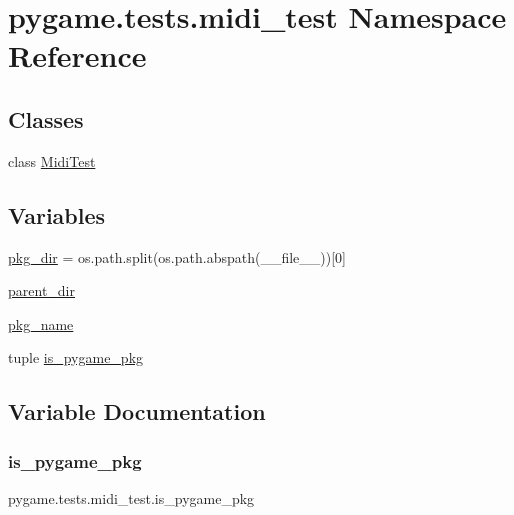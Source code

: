 \hypertarget{namespacepygame_1_1tests_1_1midi__test}{}\section{pygame.\+tests.\+midi\+\_\+test Namespace Reference}
\label{namespacepygame_1_1tests_1_1midi__test}
\subsection*{Classes}
\begin{DoxyCompactItemize}
\item 
class \hyperlink{classpygame_1_1tests_1_1midi__test_1_1_midi_test}{Midi\+Test}
\end{DoxyCompactItemize}
\subsection*{Variables}
\begin{DoxyCompactItemize}
\item 
\hyperlink{namespacepygame_1_1tests_1_1midi__test_a1a22cf194c8763d0c4488fdc0c03ce4f}{pkg\+\_\+dir} = os.\+path.\+split(os.\+path.\+abspath(\+\_\+\+\_\+file\+\_\+\+\_\+))\mbox{[}0\mbox{]}
\item 
\hyperlink{namespacepygame_1_1tests_1_1midi__test_ad3312256b255a29d5e0545098274ea9f}{parent\+\_\+dir}
\item 
\hyperlink{namespacepygame_1_1tests_1_1midi__test_aafd2775bc30ddbc396ee0e7a5b4d3835}{pkg\+\_\+name}
\item 
tuple \hyperlink{namespacepygame_1_1tests_1_1midi__test_a92ab905907785da721cae248e8b68858}{is\+\_\+pygame\+\_\+pkg}
\end{DoxyCompactItemize}


\subsection{Variable Documentation}
\mbox{\label{namespacepygame_1_1tests_1_1midi__test_a92ab905907785da721cae248e8b68858}} 
\subsubsection{\texorpdfstring{is\+\_\+pygame\+\_\+pkg}{is\_pygame\_pkg}}
{\footnotesize\ttfamily pygame.\+tests.\+midi\+\_\+test.\+is\+\_\+pygame\+\_\+pkg}

